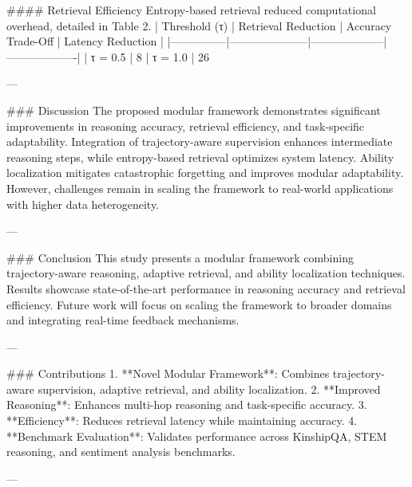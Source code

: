 #### Retrieval Efficiency  
Entropy-based retrieval reduced computational overhead, detailed in Table 2.  
| Threshold (τ) | Retrieval Reduction | Accuracy Trade-Off | Latency Reduction |  
|---------------|---------------------|--------------------|-------------------|  
| τ = 0.5       | 8%
| τ = 1.0       | 26%

---

### Discussion  
The proposed modular framework demonstrates significant improvements in reasoning accuracy, retrieval efficiency, and task-specific adaptability. Integration of trajectory-aware supervision enhances intermediate reasoning steps, while entropy-based retrieval optimizes system latency. Ability localization mitigates catastrophic forgetting and improves modular adaptability. However, challenges remain in scaling the framework to real-world applications with higher data heterogeneity.

---

### Conclusion  
This study presents a modular framework combining trajectory-aware reasoning, adaptive retrieval, and ability localization techniques. Results showcase state-of-the-art performance in reasoning accuracy and retrieval efficiency. Future work will focus on scaling the framework to broader domains and integrating real-time feedback mechanisms.

---

### Contributions  
1. **Novel Modular Framework**: Combines trajectory-aware supervision, adaptive retrieval, and ability localization.  
2. **Improved Reasoning**: Enhances multi-hop reasoning and task-specific accuracy.  
3. **Efficiency**: Reduces retrieval latency while maintaining accuracy.  
4. **Benchmark Evaluation**: Validates performance across KinshipQA, STEM reasoning, and sentiment analysis benchmarks.  

---